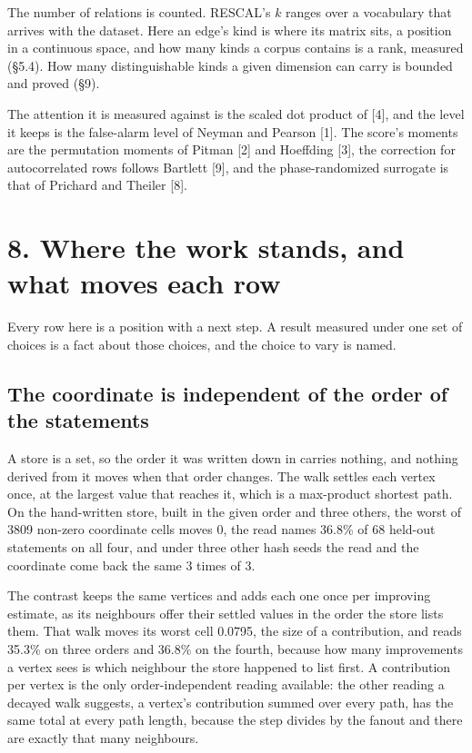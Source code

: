 \documentclass[10pt,letterpaper,twocolumn]{article}
\begin{document}
The number of relations is counted. RESCAL's \(k\) ranges over a vocabulary that arrives with the
dataset. Here an edge's kind is where its matrix sits, a position in a continuous space, and how many
kinds a corpus contains is a rank, measured (§5.4). How many distinguishable kinds a given dimension
can carry is bounded and proved (§9).

The attention it is measured against is the scaled dot product of {[}4{]}, and the level it keeps is the
false-alarm level of Neyman and Pearson {[}1{]}. The score's moments are the permutation moments of
Pitman {[}2{]} and Hoeffding {[}3{]}, the correction for autocorrelated rows follows Bartlett {[}9{]}, and the
phase-randomized surrogate is that of Prichard and Theiler {[}8{]}.

\section{8. Where the work stands, and what moves each row}\label{8-where-the-work-stands-and-what-moves-each-row}

Every row here is a position with a next step. A result measured under one set of choices is a fact
about those choices, and the choice to vary is named.

\subsection{The coordinate is independent of the order of the statements}\label{the-coordinate-is-independent-of-the-order-of-the-statements}

A store is a set, so the order it was written down in carries nothing, and nothing derived from it
moves when that order changes. The walk settles each vertex once, at the largest value that reaches
it, which is a max-product shortest path. On the hand-written store, built in the given order and
three others, the worst of 3809 non-zero coordinate cells moves 0, the read names 36.8\% of 68
held-out statements on all four, and under three other hash seeds the read and the coordinate come
back the same 3 times of 3.

The contrast keeps the same vertices and adds each one once per improving estimate, as its
neighbours offer their settled values in the order the store lists them. That walk moves its worst
cell 0.0795, the size of a contribution, and reads 35.3\% on three orders and 36.8\% on the fourth,
because how many improvements a vertex sees is which neighbour the store happened to list first. A
contribution per vertex is the only order-independent reading available: the other reading a decayed
walk suggests, a vertex's contribution summed over every path, has the same total at every path
length, because the step divides by the fanout and there are exactly that many neighbours.
\end{document}
